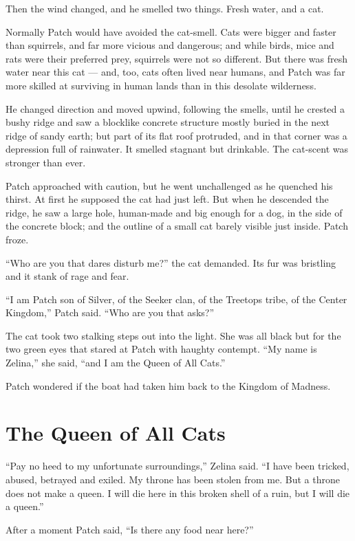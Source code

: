 \documentclass[ebook,oneside,openany,12pt]{memoir}
\begin{document}
Then the wind changed, and he smelled two things. Fresh water, and a
cat.

Normally Patch would have avoided the cat-smell. Cats were bigger and
faster than squirrels, and far more vicious and dangerous; and while
birds, mice and rats were their preferred prey, squirrels were not so
different. But there was fresh water near this cat — and, too, cats
often lived near humans, and Patch was far more skilled at surviving
in human lands than in this desolate wilderness.

He changed direction and moved upwind, following the smells, until he
crested a bushy ridge and saw a blocklike concrete structure mostly
buried in the next ridge of sandy earth; but part of its flat roof
protruded, and in that corner was a depression full of rainwater. It
smelled stagnant but drinkable. The cat-scent was stronger than ever.

Patch approached with caution, but he went unchallenged as he quenched
his thirst. At first he supposed the cat had just left. But when he
descended the ridge, he saw a large hole, human-made and big enough
for a dog, in the side of the concrete block; and the outline of a
small cat barely visible just inside. Patch froze.

“Who are you that dares disturb me?” the cat demanded. Its fur was
bristling and it stank of rage and fear.

“I am Patch son of Silver, of the Seeker clan, of the Treetops tribe,
of the Center Kingdom,” Patch said. “Who are you that asks?”

The cat took two stalking steps out into the light. She was all black
but for the two green eyes that stared at Patch with haughty
contempt. “My name is Zelina,” she said, “and I am the Queen of All
Cats.”

Patch wondered if the boat had taken him back to the Kingdom of
Madness.


\section{The Queen of All Cats}

“Pay no heed to my unfortunate surroundings,” Zelina said. “I have
been tricked, abused, betrayed and exiled. My throne has been stolen
from me. But a throne does not make a queen. I will die here in this
broken shell of a ruin, but I will die a queen.”

After a moment Patch said, “Is there any food near here?”
\end{document}
